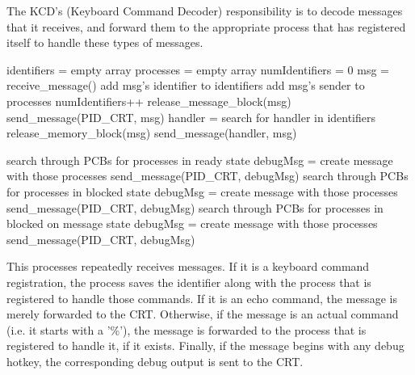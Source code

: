 \documentclass[12pt]{report}
\begin{document}
The KCD's (Keyboard Command Decoder) responsibility is to decode messages that it receives, and forward them to the appropriate process that has registered itself to handle these types of messages.

\begin{algorithmic}[1]
    \State identifiers = empty array
    \State processes = empty array
    \State numIdentifiers = 0
      \State msg = receive\_message()
        \State add msg's identifier to identifiers
        \State add msg's sender to processes
        \State numIdentifiers++
        \State release\_message\_block(msg)
        \State send\_message(PID\_CRT, msg)
      \Else
          \State handler = search for handler in identifiers
        \EndIf
          \State release\_memory\_block(msg)
        \Else
          \State send\_message(handler, msg)
        \EndIf

          \State search through PCBs for processes in ready state
          \State debugMsg = create message with those processes
          \State send\_message(PID\_CRT, debugMsg)
          \State search through PCBs for processes in blocked state
          \State debugMsg = create message with those processes
          \State send\_message(PID\_CRT, debugMsg)
          \State search through PCBs for processes in blocked on message state
          \State debugMsg = create message with those processes
          \State send\_message(PID\_CRT, debugMsg)
        \EndIf
      \EndIf
    \EndWhile
  \EndFunction
\end{algorithmic}

This processes repeatedly receives messages. If it is a keyboard command registration, the process saves the identifier along with the process that is registered to handle those commands. If it is an echo command, the message is merely forwarded to the CRT. Otherwise, if the message is an actual command (i.e. it starts with a '\%'), the message is forwarded to the process that is registered to handle it, if it exists. Finally, if the message begins with any debug hotkey, the corresponding debug output is sent to the CRT.

\end{document}
